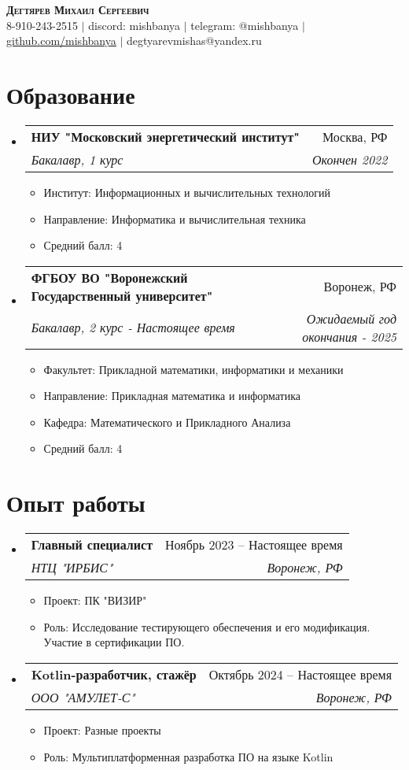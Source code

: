 \documentclass[letterpaper,11pt]{article}
\makeatletter
\newcommand{\resumeItem}[1]{
  \item\small{
    {#1 \vspace{-2pt}}
  }
}
\newcommand{\resumeSubheading}[4]{
  \vspace{-2pt}\item
    \begin{tabular*}{0.97\textwidth}[t]{l@{\extracolsep{\fill}}r}
      \textbf{#1} & #2 \\
      \textit{\small#3} & \textit{\small #4} \\
    \end{tabular*}\vspace{-7pt}
}
\newcommand{\resumeSubHeadingListStart}{\begin{itemize}[leftmargin=0.15in, label={}]}
\newcommand{\resumeSubHeadingListEnd}{\end{itemize}}
\newcommand{\resumeItemListStart}{\begin{itemize}}
\newcommand{\resumeItemListEnd}{\end{itemize}\vspace{-5pt}}
\makeatother
\begin{document}


\begin{center}
    \textbf{\Huge \scshape Дегтярев Михаил Сергеевич} \\ \vspace{1pt}
    \small 8-910-243-2515 $|$ {discord: mishbanya} $|$ 
    {telegram: @mishbanya} $|$
    \href{https://github.com/mishbanya}{\underline{github.com/mishbanya}} $|$
    {{degtyarevmishas@yandex.ru}}
\end{center}


\section{Образование}
  \resumeSubHeadingListStart
    \resumeSubheading
      {НИУ "Московский энергетический институт"}{Москва, РФ}
      {Бакалавр, 1 курс}{Окончен 2022}
          \resumeItemListStart
          \resumeItem{Институт: Информационных и вычислительных технологий}
            \resumeItem{Направление: Информатика и вычислительная техника}
            \resumeItem{Средний балл: 4}
        \resumeItemListEnd
    \resumeSubheading
      {ФГБОУ ВО "Воронежский Государственный университет"}{Воронеж, РФ}
      {Бакалавр, 2 курс - Настоящее время}{Ожидаемый год окончания - 2025}
          \resumeItemListStart
              \resumeItem{Факультет: Прикладной математики, информатики и механики}
            \resumeItem{Направление: Прикладная математика и информатика}
            \resumeItem{Кафедра: Математического и Прикладного Анализа}
            \resumeItem{Средний балл: 4}
            
        \resumeItemListEnd

  \resumeSubHeadingListEnd

\section{Опыт работы}
  \resumeSubHeadingListStart

    \resumeSubheading
      {Главный специалист}{Ноябрь 2023 – Настоящее время}
      {НТЦ "ИРБИС"}{Воронеж, РФ}
      \resumeItemListStart
      \resumeItem{Проект: ПК "ВИЗИР"}
        \resumeItem{Роль: Исследование тестирующего обеспечения и его модификация. Участие в сертификации ПО.}
      \resumeItemListEnd
    \resumeSubHeadingListEnd
  \resumeSubHeadingListStart
    \resumeSubheading
      {Kotlin-разработчик, стажёр}{Октябрь 2024 – Настоящее время}
      {ООО "АМУЛЕТ-С"}{Воронеж, РФ}
      \resumeItemListStart
      \resumeItem{Проект: Разные проекты}
        \resumeItem{Роль: Мультиплатформенная разработка ПО на языке Kotlin}
      \resumeItemListEnd
    \resumeSubHeadingListEnd
\end{document}
